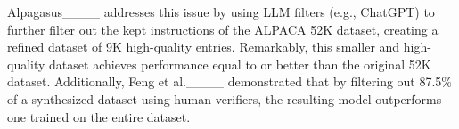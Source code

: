 Alpagasus____ addresses this issue 
by using LLM filters (e.g., ChatGPT)
to further filter out the kept instructions of the ALPACA 52K dataset,
creating a refined dataset of 9K high-quality entries. 
Remarkably, this smaller and high-quality
dataset achieves performance equal to or better than the original 52K dataset.
Additionally, Feng et al.____ demonstrated that by
filtering out 87.5\% of a synthesized dataset using human verifiers, the resulting
model outperforms one trained on the entire dataset.

\begin{comment}
\sj{(아래 문장의 경우 이전 설명과 많이 겹쳐서 특별히 필요 없을 듯 합니다.
대신에 Fig. 2를 다를 위치에 넣어서 과도한 API invocation 문제는 언급해야할 듯 합니다.)}
\fixme{
Moreover, the ROUGE-L similarity-based data filtering process of 
the Self-Instruct methodology also involves an excessive number of ChatGPT 
API requests. This filtering process adds a new instruction to the task pool only if its ROUGE-L
similarity with any existing instructions is less than 0.7 \review{(the number is
empirically set in Self-Instruct).} While this approach effectively encourages
diversity, it results in the elimination of over half of the generated instructions.
\FIG{fig:api-inefficiency} illustrates the actual number of generated data
points over time compared to the number of ChatGPT API requests made. Initially,
most of the generated instructions are kept. However, as the number of existing
instructions increases, more than half of the new instructions are filtered out.
This trend becomes increasingly severe as the amount of data grows, highlighting
inefficiencies within the filtering process. Consequently, this inefficiency
leads to high resource and cost consumption.
}
\end{comment}